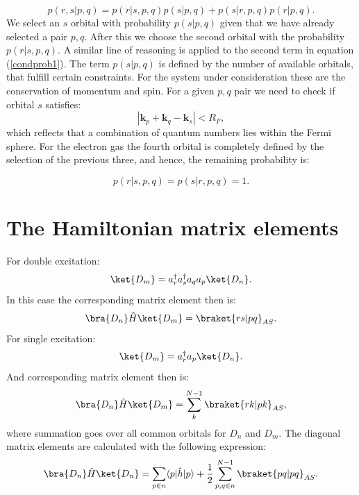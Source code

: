 \documentclass[twoside,english]{uiofysmaster}
\begin{document}
\begin{equation}\label{condprob1}
p(r,s|p,q) = p(r|s,p,q)p(s|p,q) + p(s|r,p,q)p(r|p,q).
\end{equation}
We select an $s$ orbital with probability $p(s|p,q)$ given that we have already selected a pair $p,q$. After this we choose the second orbital with the probability $p(r|s,p,q)$. A similar line of reasoning is applied to the second term in equation (\ref{condprob1}). The term $p(s|p,q)$ is defined by the number of available orbitals, that fulfill certain constraints. For the system under consideration  these are the conservation of momentum and spin. For a given $p,q$ pair we need to check if orbital $s$ satisfies:
\begin{equation}
|\boldsymbol{k}_p + \boldsymbol{k}_q - \boldsymbol{k}_s|  < R_F,
\end{equation} 
which reflects that a combination of quantum numbers lies within the Fermi sphere.
For the electron gas the fourth orbital is completely defined by the selection of the previous three, and hence, the remaining probability is:

\begin{equation}
p(r|s,p,q) = p(s|r,p,q) = 1.
\end{equation}

\section{The Hamiltonian matrix elements}

For double excitation:
\begin{equation}
\ket{D_{m}}=a^\dagger_r a^\dagger_s a_q a_p \ket{D_n}.
\end{equation}
In this case the corresponding matrix element then is:
\begin{equation}
\bra{D_n} \hat{H}\ket{D_{m}}=\braket{rs|pq}_{AS}.
\end{equation}
For single excitation:
\begin{equation}
\ket{D_{m}}=a^\dagger_r  a_p \ket{D_n}.
\end{equation}
And corresponding matrix element then is:
\begin{equation}
\bra{D_n} \hat{H}\ket{D_{m}}=\sum_{k}^{N-1}\braket{rk|pk}_{AS},
\end{equation}
where summation goes over all common orbitals  for $D_n$ and $D_m$.
The diagonal matrix elements are calculated with the following expression:
\begin{equation}
\bra{D_n} \hat{H}\ket{D_{n}}=\sum_{p\in n} \langle p|\hat{h}|p\rangle + \frac{1}{2} \sum_{p,q \in n}^{N-1}\braket{pq|pq}_{AS}.
\end{equation}
\end{document}
